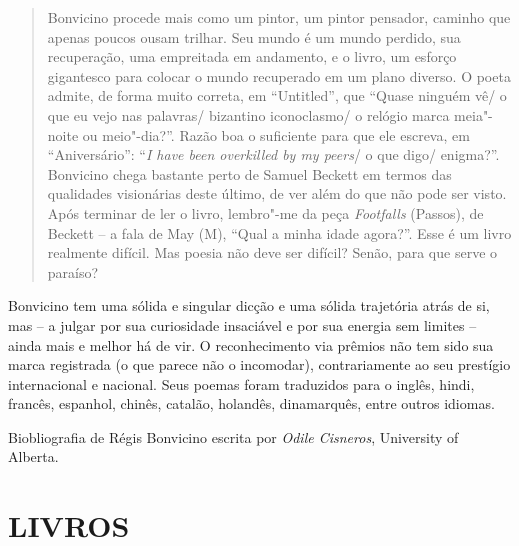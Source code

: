 \begin{quote}
Bonvicino procede mais como um pintor, um pintor pensador, caminho que
apenas poucos ousam trilhar. Seu mundo é um mundo perdido, sua
recuperação, uma empreitada em andamento, e o livro, um esforço
gigantesco para colocar o mundo recuperado em um plano diverso. O poeta
admite, de forma muito correta, em ``Untitled'', que ``Quase ninguém vê/
o que eu vejo nas palavras/ bizantino iconoclasmo/ o relógio marca
meia"-noite ou meio"-dia?''. Razão boa o suficiente para que ele escreva,
em ``Aniversário'': ``\emph{I have been overkilled by my peers}/ o que
digo/ enigma?''. Bonvicino chega bastante perto de Samuel Beckett em
termos das qualidades visionárias deste último, de ver além do que não
pode ser visto. Após terminar de ler o livro, lembro"-me da peça
\emph{Footfalls} (Passos), de Beckett -- a fala de May (M), ``Qual a
minha idade agora?''. Esse é um livro realmente difícil. Mas poesia não
deve ser difícil? Senão, para que serve o paraíso?
\end{quote}

Bonvicino tem uma sólida e singular dicção e uma sólida trajetória atrás
de si, mas -- a julgar por sua curiosidade insaciável e por sua energia
sem limites -- ainda mais e melhor há de vir. O reconhecimento via
prêmios não tem sido sua marca registrada (o que parece não o
incomodar), contrariamente ao seu prestígio internacional e nacional.
Seus poemas foram traduzidos para o inglês, hindi, francês, espanhol,
chinês, catalão, holandês, dinamarquês, entre outros idiomas.

Biobliografia de Régis Bonvicino escrita por \emph{Odile Cisneros},
University of Alberta.

\section{LIVROS}

